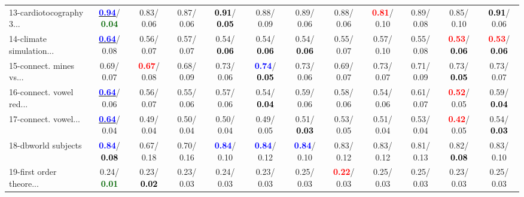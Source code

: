 \begin{table}[h]
\begin{center}
{\begin{tabular}{lc|c|c|c|c|c|c|c|c|c|c}
13-cardiotocography 3... & \underline{\textcolor{blue}{\textbf{  0.94}}}/\textcolor{darkgreen}{\textbf{  0.04}} &   0.83/  0.06 &   0.87/  0.06 & \textcolor{black}{\textbf{  0.91}}/\textcolor{black}{\textbf{  0.05}} &   0.88/  0.09 &   0.89/  0.06 &   0.88/  0.06 & \textcolor{red}{\textbf{  0.81}}/  0.10 &   0.89/  0.08 &   0.85/  0.10 & \textcolor{black}{\textbf{  0.91}}/  0.06 \\
14-climate simulation... & \underline{\textcolor{blue}{\textbf{  0.64}}}/  0.08 &   0.56/  0.07 &   0.57/  0.07 &   0.54/\textcolor{black}{\textbf{  0.06}} &   0.54/\textcolor{black}{\textbf{  0.06}} &   0.54/\textcolor{black}{\textbf{  0.06}} &   0.55/  0.07 &   0.57/  0.10 &   0.55/  0.08 & \textcolor{red}{\textbf{  0.53}}/\textcolor{black}{\textbf{  0.06}} & \textcolor{red}{\textbf{  0.53}}/\textcolor{black}{\textbf{  0.06}} \\ \hline
15-connect. mines vs... &   0.69/  0.07 & \textcolor{red}{\textbf{  0.67}}/  0.08 &   0.68/  0.09 &   0.73/  0.06 & \textcolor{blue}{\textbf{  0.74}}/\textcolor{black}{\textbf{  0.05}} &   0.73/  0.06 &   0.69/  0.07 &   0.73/  0.07 &   0.71/  0.09 &   0.73/\textcolor{black}{\textbf{  0.05}} &   0.73/  0.07 \\
16-connect. vowel red... & \underline{\textcolor{blue}{\textbf{  0.64}}}/  0.06 &   0.56/  0.07 &   0.55/  0.06 &   0.57/  0.06 &   0.54/\textcolor{black}{\textbf{  0.04}} &   0.59/  0.06 &   0.58/  0.06 &   0.54/  0.06 &   0.61/  0.07 & \textcolor{red}{\textbf{  0.52}}/  0.05 &   0.59/\textcolor{black}{\textbf{  0.04}} \\
17-connect. vowel... & \underline{\textcolor{blue}{\textbf{  0.64}}}/  0.04 &   0.49/  0.04 &   0.50/  0.04 &   0.50/  0.04 &   0.49/  0.05 &   0.51/\textcolor{black}{\textbf{  0.03}} &   0.53/  0.05 &   0.51/  0.04 &   0.53/  0.04 & \textcolor{red}{\textbf{  0.42}}/  0.05 &   0.54/\textcolor{black}{\textbf{  0.03}} \\
18-dbworld subjects & \textcolor{blue}{\textbf{  0.84}}/\textcolor{black}{\textbf{  0.08}} &   0.67/  0.18 &   0.70/  0.16 & \textcolor{blue}{\textbf{  0.84}}/  0.10 & \textcolor{blue}{\textbf{  0.84}}/  0.12 & \textcolor{blue}{\textbf{  0.84}}/  0.10 &   0.83/  0.12 &   0.83/  0.12 &   0.81/  0.13 &   0.82/\textcolor{black}{\textbf{  0.08}} &   0.83/  0.10 \\
19-first order theore... &   0.24/\textcolor{darkgreen}{\textbf{  0.01}} &   0.23/\textcolor{black}{\textbf{  0.02}} &   0.23/  0.03 &   0.24/  0.03 &   0.23/  0.03 &   0.25/  0.03 & \textcolor{red}{\textbf{  0.22}}/  0.03 &   0.25/  0.03 &   0.25/  0.03 &   0.23/  0.03 &   0.25/  0.03 \\

\end{tabular}}
\end{center}
\end{table}
